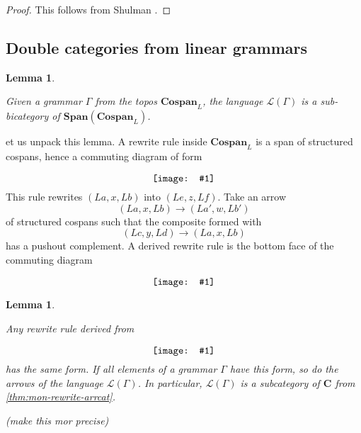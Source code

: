 \documentclass{amsart}
\newcommand{\C}{\cat{C}}
\newcommand{\cat}[1]{\mathbf{#1}}
\newcommand{\diagram}[1]{\raisebox{-0.5\height}{\texttt{[image: \#1]}}}
\newcommand{\Span}{\mathbf{Span}}
\newcommand{\Cospan}{\mathbf{Cospan}}
\newcommand{\edit}[1]{\textcolor{editcolour}{(#1)}}
\newenvironment{exposition}[1]{}{}
\newtheorem{lemma}[theorem]{Lemma}
\theoremstyle{remark}
\theoremstyle{definition}
\begin{document}
\begin{proof}
  
  This follows from Shulman \cite{shulman-constructing}.
  
\end{proof}


\subsection{Double categories from linear grammars}
\label{sec:dblcats-linr-gramrs}

\begin{lemma}
  \label{thm:lr_open-objects-language}

  Given a grammar $ \Gamma $ from the topos $ \Cospan_L $, the
  language $ \mathcal{L}(\Gamma) $ is a sub-bicategory of
  $ \Span ( \Cospan_{L} ) $.
  
\end{lemma}

\begin{exposition}

  Let us unpack this lemma.  A rewrite rule inside \( \Cospan_L \) is
  a span of structured cospans, hence a commuting diagram of form
  \[
    \diagram{diag_lr_rewr-struct-cospans}
  \]
  This rule rewrites \( ( La , x , Lb ) \)
  into \( (  Le , z , Lf ) \). Take an arrow 
  \[
    ( La , x , Lb ) \to ( La' , w , Lb' )
  \]
  of structured cospans such that the composite formed with
  \[
    ( Lc , y , Ld) \to ( La , x , Lb)
  \]
  has a pushout complement. A derived rewrite rule is the bottom
  face of the commuting diagram
  \[
    \diagram{diag_lr_-derived-rewrite-rule}
  \]
  
\end{exposition}

\begin{lemma}
  \label{thm:der-rewr-rule-dbl-monic}

  Any rewrite rule derived from 
  \[
    \diagram{diag_lr-grammar-2cell}
  \]
  has the same form. If all elements of a grammar \( \Gamma \) have
  this form, so do the arrows of the language
  \( \mathcal{L} (\Gamma) \).  In particular, \( \mathcal{L} (\Gamma)
  \) is a subcategory of \( \C \) from \ref{thm:mon-rewrite-arrcat}.

  \edit{make this mor precise}
  
\end{lemma}
\end{document}
